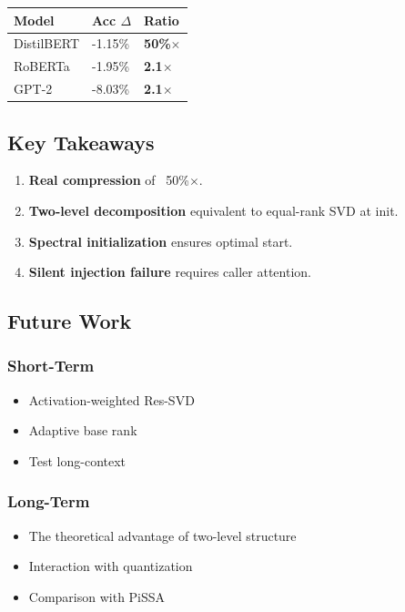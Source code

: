 \begin{table}[H]
\centering
\small
\begin{tabular}{lll}
\toprule
\textbf{Model} & \textbf{Acc $\Delta$} & \textbf{Ratio} \\
\midrule
DistilBERT & -1.15\% & \textbf{50\%$\times$} \\
RoBERTa & -1.95\% & \textbf{2.1$\times$} \\
GPT-2 & -8.03\% & \textbf{2.1$\times$} \\
\bottomrule
\end{tabular}
\end{table}

\subsection{Key Takeaways}

\begin{enumerate}
\item \textbf{Real compression} of ~50\%$\times$.
\item \textbf{Two-level decomposition} equivalent to equal-rank SVD at init.
\item \textbf{Spectral initialization} ensures optimal start.
\item \textbf{Silent injection failure} requires caller attention.

\end{enumerate}
\subsection{Future Work}

\subsubsection{Short-Term}
\begin{itemize}
\item Activation-weighted Res-SVD
\item Adaptive base rank
\item Test long-context

\end{itemize}
\subsubsection{Long-Term}
\begin{itemize}
\item The theoretical advantage of two-level structure
\item Interaction with quantization
\item Comparison with PiSSA

\end{itemize}
